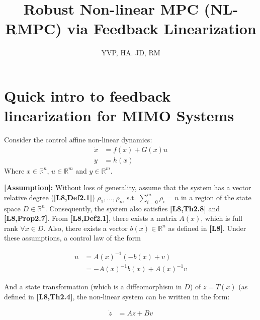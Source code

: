 \documentclass{article}[14pt]
\title{Robust Non-linear MPC (NL-RMPC) via Feedback Linearization}
\author{YVP, HA. JD, RM}
\begin{document}
\maketitle

\section{Quick intro to feedback linearization for MIMO Systems}

Consider the control affine non-linear dynamics:
\begin{subequations}
\begin{align}
\dot{x}&=f(x)+G(x)u \\
y&=h(x)
\end{align}
\end{subequations}
Where $x\in\mathbb{R}^n$, $u\in\mathbb{R}^m$ and $y\in\mathbb{R}^m$.

\textbf{[Assumption]:} Without loss of generality, assume that the system has a vector relative degree (\textbf{[L8,Def2.1]}) $\rho_1,\dotsc,\rho_m$ s.t. $\sum_{i=0}^m \rho_i=n$ in a region of the state space $D\in\mathbb{R}^n$. Consequently, the system also satisfies \textbf{[L8,Th2.8]} and \textbf{[L8,Prop2.7]}. From \textbf{[L8,Def2.1]}, there exists a matrix $A(x)$, which is full rank $\forall x \in D$. Also, there exists a vector $b(x) \in \mathbb{R}^n$ as defined in \textbf{[L8]}. Under these assumptions, a control law of the form

\begin{subequations}
\begin{align}
u&=A(x)^{-1}(-b(x)+v) \\
&=-A(x)^{-1}b(x)+A(x)^{-1}v
\end{align}
\end{subequations}

And a state transformation (which is a diffeomorphism in $D$) of $z=T(x)$ (as defined in \textbf{[L8,Th2.4]}, the non-linear system can be written in the form:

\begin{subequations}
\begin{align}
\dot{z}&=Az+Bv 
\end{align}
\end{subequations}
\end{document}
